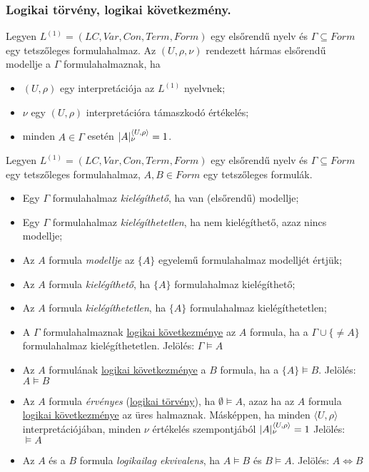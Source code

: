 \subsubsection{Logikai törvény, logikai következmény.}
\begin{definition}[modell]
	Legyen $L^{(1)} = (LC, Var, Con, Term, Form)$ egy elsőrendű nyelv és $\Gamma \subseteq Form$ egy tetszőleges formulahalmaz. Az $(U, \rho, \nu)$ rendezett hármas elsőrendű modellje a $\Gamma$ formulahalmaznak, ha 
	\begin{itemize}
		\item  $(U, \rho)$ egy interpretációja az $L^{(1)}$ nyelvnek; 
		\item  $\nu$ egy $(U, \rho)$ interpretációra támaszkodó értékelés; 
		\item  minden  $A \in \Gamma$ esetén $|A|^{\langle U, \rho \rangle}_{\nu} = 1$.
	\end{itemize}
	
\end{definition}
\begin{definition}
	Legyen $L^{(1)} = (LC, Var, Con, Term, Form)$ egy elsőrendű nyelv és $\Gamma \subseteq Form$ egy tetszőleges formulahalmaz, $A,B \in Form$ egy tetszőleges formulák.
	\begin{itemize}
		\item Egy $\Gamma$ formulahalmaz \emph{kielégíthető}, ha van (elsőrendű) modellje;
		\item Egy $\Gamma$ formulahalmaz \emph{kielégíthetetlen}, ha nem kielégíthető, azaz nincs modellje;
		\item Az $A$ formula \emph{modellje} az $\{A\}$ egyelemű formulahalmaz modelljét értjük;
		\item Az $A$ formula \emph{kielégíthető}, ha $\{A\}$ formulahalmaz kielégíthető;
		\item Az $A$ formula \emph{kielégíthetetlen}, ha $\{A\}$ formulahalmaz kielégíthetetlen;
		\item A  $\Gamma$ formulahalmaznak \underline{logikai következménye} az $A$ formula, ha a $\Gamma \cup \{\neq A\}$ formulahalmaz kielégíthetetlen. Jelölés: $\Gamma \models A$ 
		\item Az $A$ formulának \underline{logikai következménye} a $B$ formula, ha a $\{A\} \models B$. Jelölés: $A \models B$ 
		\item Az $A$ formula \emph{érvényes} (\underline{logikai törvény})\label{def:logikai törvény}, ha $\emptyset \models A$, azaz ha az $A$ formula \underline{logikai következménye} az üres halmaznak. Másképpen, ha minden $ \langle U, \rho \rangle$ interpretációjában, minden $\nu$ értékelés szempontjából $|A|^{\langle U, \rho \rangle}_{\nu} = 1$ Jelölés: $\models A$
		\item Az $A$ és a $B$ formula \emph{logikailag ekvivalens}, ha $A \models B$ és $B \models A$. Jelölés: $A \Leftrightarrow B$ 
	\end{itemize}
\end{definition}


